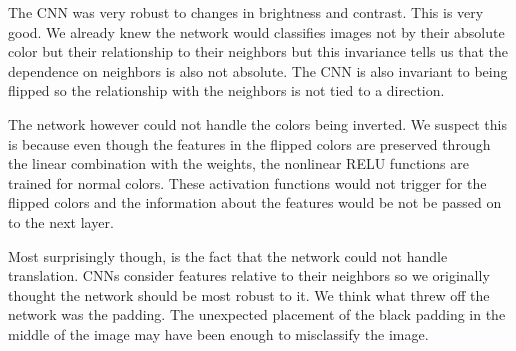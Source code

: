 \documentclass[10pt,twoside]{article}
\begin{document}
The CNN was very robust to changes in brightness and contrast. This is very good. We already knew the network would classifies images not by their absolute color but their relationship to their neighbors but this invariance tells us that the dependence on neighbors is also not absolute. The CNN is also invariant to being flipped so the relationship with the neighbors is not tied to a direction.

The network however could not handle the colors being inverted. We suspect this is because even though the features in the flipped colors are preserved through the linear combination with the weights, the nonlinear RELU functions are trained for normal colors. These activation functions would not trigger for the flipped colors and the information about the features would be not be passed on to the next layer.

Most surprisingly though, is the fact that the network could not handle translation. CNNs consider features relative to their neighbors so we originally thought the network should be most robust to it. We think what threw off the network was the padding. The unexpected placement of the black padding in the middle of the image may have been enough to misclassify the image.

\vfill
\end{document}
